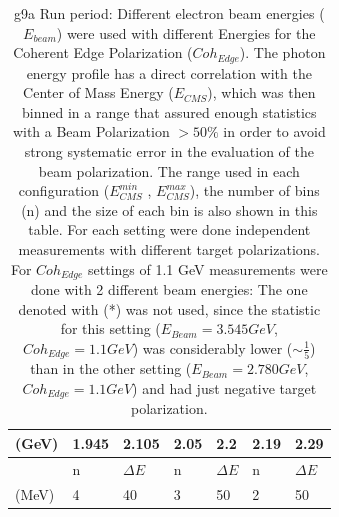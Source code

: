 \begin{table}
\begin{center}
\begin{tabular}{ |l||l|l||l|l||l|l||l|l||}
      \multicolumn{3}{|l||}{(GeV)} & 1.945 & 2.105 & 2.05 & 2.2 & 2.19 & 2.29 \\
      \hline
      \multicolumn{3}{|l||}{} & n  &  $\Delta E$ & n  &  $\Delta E$ & n  &  $\Delta E$ \\
      \multicolumn{3}{|l||}{(MeV)} & 4 & 40 & 3 & 50 & 2 & 50  \\
      \hline
    \end{tabular}
  \end{center}
  \caption{g9a Run period: Different electron beam energies ($E_{beam}$) were used with different Energies for the Coherent Edge Polarization ($Coh_{Edge}$). The photon energy profile has a direct correlation with the Center of Mass Energy ($E_{CMS}$), which was then binned in a range that assured enough statistics with a Beam Polarization $>50\%$ in order to avoid strong systematic error in the evaluation of the beam polarization. The range used in each configuration ($E_{CMS}^{min} $ ,  $E_{CMS}^{max}$), the number of bins (n) and the size of each bin is also shown in this table. For each setting were done independent measurements with different target polarizations. For $Coh_{Edge}$ settings of 1.1 GeV measurements were done with 2 different beam energies: The one denoted with (*) was not used, since the statistic for this setting ($E_{Beam}=3.545 GeV$, $Coh_{Edge}=1.1 GeV$) was considerably lower ($\sim \frac{1}{5}$) than in the other setting ($E_{Beam}=2.780 GeV$, $Coh_{Edge}=1.1 GeV$) and had just negative target polarization.} \label{tab:g9a_configs}
\end{table}

